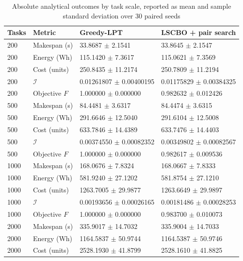 \documentclass[pdflatex,onecolumn,sn-mathphys-num]{sn-jnl}
\begin{document}
\begingroup
\small
\setlength{\tabcolsep}{3pt}
\renewcommand{\arraystretch}{1.10}
\begin{table}[!htbp]
\centering
\caption{Absolute analytical outcomes by task scale, reported as mean and sample standard deviation over 30 paired seeds}\label{tab:main_scale_dispersion}
\begin{tabular}{@{}p{}p{}p{}p{}@{}}
\toprule
Tasks & Metric & Greedy-LPT & LSCBO + pair search \\
\midrule

200 & Makespan (s) & 33.8687 $\pm$ 2.1541 & 33.8645 $\pm$ 2.1547 \\
200 & Energy (Wh) & 115.1420 $\pm$ 7.3617 & 115.0621 $\pm$ 7.3569 \\
200 & Cost (units) & 250.8435 $\pm$ 11.2174 & 250.7809 $\pm$ 11.2194 \\
200 & $\mathcal{I}$ & 0.01261807 $\pm$ 0.00400195 & 0.01175829 $\pm$ 0.00384325 \\
200 & Objective $F$ & 1.000000 $\pm$ 0.000000 & 0.982632 $\pm$ 0.012426 \\
500 & Makespan (s) & 84.4481 $\pm$ 3.6317 & 84.4474 $\pm$ 3.6315 \\
500 & Energy (Wh) & 291.6646 $\pm$ 12.5040 & 291.6104 $\pm$ 12.5008 \\
500 & Cost (units) & 633.7846 $\pm$ 14.4389 & 633.7476 $\pm$ 14.4403 \\
500 & $\mathcal{I}$ & 0.00374550 $\pm$ 0.00082352 & 0.00349802 $\pm$ 0.00082567 \\
500 & Objective $F$ & 1.000000 $\pm$ 0.000000 & 0.982617 $\pm$ 0.009536 \\
1000 & Makespan (s) & 168.0676 $\pm$ 7.8324 & 168.0667 $\pm$ 7.8333 \\
1000 & Energy (Wh) & 581.9240 $\pm$ 27.1202 & 581.8754 $\pm$ 27.1210 \\
1000 & Cost (units) & 1263.7005 $\pm$ 29.9877 & 1263.6649 $\pm$ 29.9897 \\
1000 & $\mathcal{I}$ & 0.00193656 $\pm$ 0.00026165 & 0.00181486 $\pm$ 0.00028253 \\
1000 & Objective $F$ & 1.000000 $\pm$ 0.000000 & 0.983700 $\pm$ 0.010073 \\
2000 & Makespan (s) & 335.9017 $\pm$ 14.7032 & 335.9004 $\pm$ 14.7033 \\
2000 & Energy (Wh) & 1164.5837 $\pm$ 50.9744 & 1164.5387 $\pm$ 50.9746 \\
2000 & Cost (units) & 2528.1930 $\pm$ 41.8799 & 2528.1610 $\pm$ 41.8825 \\

\end{tabular}
\end{table}
\end{document}
